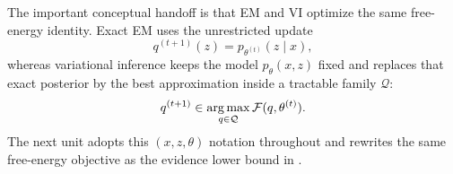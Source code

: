 The important conceptual handoff is that EM and VI optimize the same free-energy identity.
Exact EM uses the unrestricted update
\[
  q^{(t+1)}(z)=p_{\theta^{(t)}}(z\mid x),
\]
whereas variational inference keeps the model $p_\theta(x,z)$ fixed and replaces that exact posterior by the best approximation inside a tractable family $\mathcal{Q}$:
\[
  q^{(t+1)} \in \operatorname*{arg\,max}_{q\in\mathcal{Q}} \mathcal{F}(q,\theta^{(t)}).
\]
The next unit adopts this $(x,z,\theta)$ notation throughout and rewrites the same free-energy objective as the evidence lower bound in .
